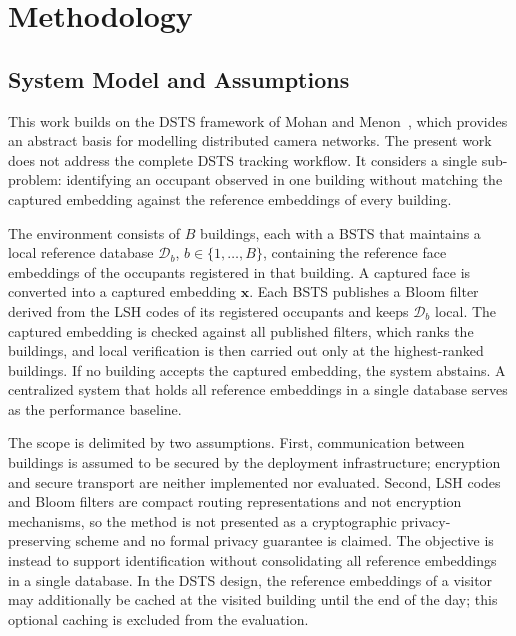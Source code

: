 \documentclass[pdflatex,sn-mathphys-num]{sn-jnl}%
\theoremstyle{thmstyleone}%
\theoremstyle{thmstyletwo}%
\theoremstyle{thmstylethree}%
\begin{document}

\section{Methodology}
\label{sec:methodology}

\subsection{System Model and Assumptions}
\label{subsec:system_model}

This work builds on the DSTS framework of Mohan and Menon~\cite{mohan2020}, which provides an abstract basis for modelling distributed camera networks. The present work does not address the complete DSTS tracking workflow. It considers a single sub-problem: identifying an occupant observed in one building without matching the captured embedding against the reference embeddings of every building.

The environment consists of $B$ buildings, each with a BSTS that maintains a local reference database $\mathcal{D}_b$, $b\in\{1,\ldots,B\}$, containing the reference face embeddings of the occupants registered in that building. A captured face is converted into a captured embedding $\mathbf{x}$. Each BSTS publishes a Bloom filter derived from the LSH codes of its registered occupants and keeps $\mathcal{D}_b$ local. The captured embedding is checked against all published filters, which ranks the buildings, and local verification is then carried out only at the highest-ranked buildings. If no building accepts the captured embedding, the system abstains. A centralized system that holds all reference embeddings in a single database serves as the performance baseline.

The scope is delimited by two assumptions. First, communication between buildings is assumed to be secured by the deployment infrastructure; encryption and secure transport are neither implemented nor evaluated. Second, LSH codes and Bloom filters are compact routing representations and not encryption mechanisms, so the method is not presented as a cryptographic privacy-preserving scheme and no formal privacy guarantee is claimed. The objective is instead to support identification without consolidating all reference embeddings in a single database. In the DSTS design, the reference embeddings of a visitor may additionally be cached at the visited building until the end of the day; this optional caching is excluded from the evaluation.
\end{document}
